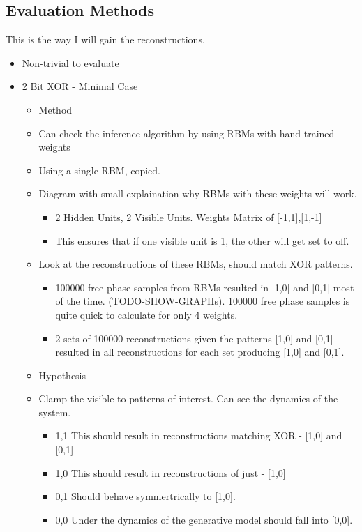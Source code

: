 \subsection{Evaluation Methods}
This is the way I will gain the reconstructions.
\begin{itemize}
  \item Non-trivial to evaluate
  \item 2 Bit XOR - Minimal Case
  \begin{itemize}
    \item Method
    \item Can check the inference algorithm by using RBMs with hand trained weights
    \item Using a single RBM, copied.
    \item Diagram with small explaination why RBMs with these weights will work.
    \begin{itemize}
      \item 2 Hidden Units, 2 Visible Units. Weights Matrix of [-1,1],[1,-1]
      \item This ensures that if one visible unit is 1, the other will get set to off.
    \end{itemize}
    \item Look at the reconstructions of these RBMs, should match XOR patterns.
    \begin{itemize}
      \item 100000 free phase samples from RBMs resulted in [1,0] and [0,1] most of the time. (TODO-SHOW-GRAPHs). 100000 free phase samples is quite quick to calculate for only 4 weights.
      \item 2 sets of 100000 reconstructions given the patterns [1,0] and [0,1] resulted in all reconstructions for each set producing [1,0] and [0,1].
    \end{itemize}
    \item Hypothesis
    \item Clamp the visible to patterns of interest. Can see the dynamics of the system.
    \begin{itemize}
      \item 1,1 This should result in reconstructions matching XOR - [1,0] and [0,1]
      \item 1,0 This should result in reconstructions of just - [1,0]
      \item 0,1 Should behave symmertrically to [1,0].
      \item 0,0 Under the dynamics of the generative model should fall into [0,0].
    \end{itemize}
  \end{itemize}


\end{itemize}
